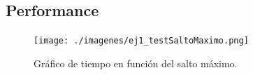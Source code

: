 \subsection{Performance}



\begin{figure}[H]
\begin{center}
\texttt{[image: ./imagenes/ej1\_testSaltoMaximo.png]}
\caption{Gr\'afico de tiempo en funci\'on del salto m\'aximo.}
\end{center}
\end{figure}

